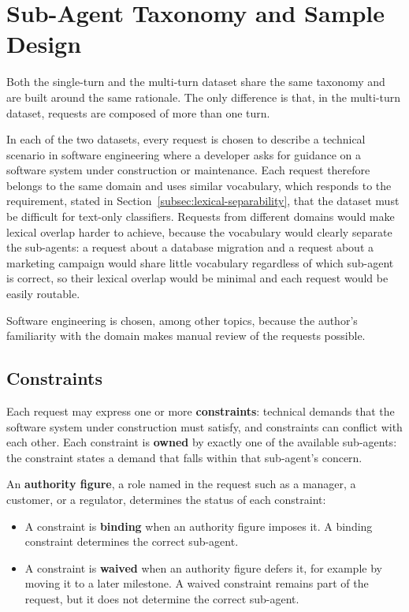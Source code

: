 \section{Sub-Agent Taxonomy and Sample Design}
\label{sec:dataset-overview}

Both the single-turn and the multi-turn dataset share the same taxonomy and are built around the same rationale. The only difference is that, in the multi-turn dataset, requests are composed of more than one turn.

In each of the two datasets, every request is chosen to describe a technical scenario in software engineering where a developer asks for guidance on a software system under construction or maintenance. Each request therefore belongs to the same domain and uses similar vocabulary, which responds to the requirement, stated in Section~\ref{subsec:lexical-separability}, that the dataset must be difficult for text-only classifiers. Requests from different domains would make lexical overlap harder to achieve, because the vocabulary would clearly separate the sub-agents: a request about a database migration and a request about a marketing campaign would share little vocabulary regardless of which sub-agent is correct, so their lexical overlap would be minimal and each request would be easily routable.

Software engineering is chosen, among other topics, because the author's familiarity with the domain makes manual review of the requests possible.

\subsection{Constraints}
\label{subsec:constraints-binding-waived}

Each request may express one or more \textbf{constraints}: technical demands that the software system under construction must satisfy, and constraints can conflict with each other. Each constraint is \textbf{owned} by exactly one of the available sub-agents: the constraint states a demand that falls within that sub-agent's concern.

An \textbf{authority figure}, a role named in the request such as a manager, a customer, or a regulator, determines the status of each constraint:

\begin{itemize}
    \item A constraint is \textbf{binding} when an authority figure imposes it. A binding constraint determines the correct sub-agent.
    \item A constraint is \textbf{waived} when an authority figure defers it, for example by moving it to a later milestone. A waived constraint remains part of the request, but it does not determine the correct sub-agent.
\end{itemize}

